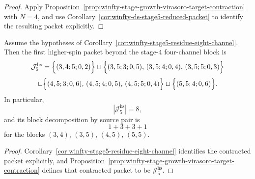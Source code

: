 \begin{proof}
Apply
Proposition~\ref{prop:winfty-stage-growth-virasoro-target-contraction}
with $N=4$, and use
Corollary~\ref{cor:winfty-ds-stage5-reduced-packet} to identify the
resulting packet explicitly.
\end{proof}

\begin{corollary}
\label{cor:winfty-stage5-higher-spin-packet}
Assume the hypotheses of
Corollary~\ref{cor:winfty-stage5-residue-eight-channel}.  Then the
first higher-spin packet beyond the stage-$4$ four-channel block is
\[
\mathcal{J}_5^{\mathrm{hs}}
=
\Bigl\{
(3,4;5;0,2)
\Bigr\}
\sqcup
\Bigl\{
(3,5;3;0,5),\,
(3,5;4;0,4),\,
(3,5;5;0,3)
\Bigr\}
\]
\[
\sqcup
\Bigl\{
(4,5;3;0,6),\,
(4,5;4;0,5),\,
(4,5;5;0,4)
\Bigr\}
\sqcup
\Bigl\{
(5,5;4;0,6)
\Bigr\}.
\]
In particular,
\[
|\mathcal{J}_5^{\mathrm{hs}}|=8,
\]
and its block decomposition by source pair is
\[
1+3+3+1
\]
for the blocks
$(3,4)$, $(3,5)$, $(4,5)$, $(5,5)$.
\end{corollary}

\begin{proof}
Corollary~\ref{cor:winfty-stage5-residue-eight-channel} identifies the
contracted packet explicitly, and
Proposition~\ref{prop:winfty-stage-growth-virasoro-target-contraction}
defines that contracted packet to be
$\mathcal{J}_5^{\mathrm{hs}}$.
\end{proof}

